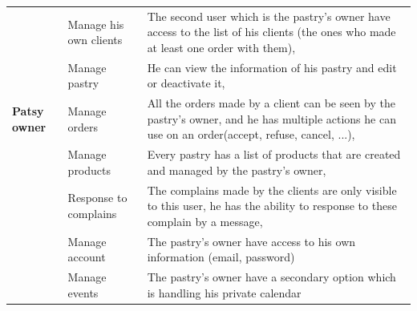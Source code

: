 \documentclass[12pt,a4paper]{report}
\begin{document}
\begin{table}[H]
\begin{center}
\begin{tabular}{|l|p{5cm}|p{8cm}| }
				\hline
				\hline
				\multirow{5}{*}{\textbf{Patsy owner} }
				& Manage his own clients & The second user which is the pastry's owner have access to the list of his clients (the ones who made at least one order with them),                
				\\
				\cline{2-3}
				& Manage pastry          & He can view the information of his pastry and edit or deactivate it,                                                                                
				\\
				\cline{2-3}
				& Manage orders          & All the orders made by a client can be seen by the pastry's owner, and he has multiple actions he can use on an order(accept, refuse, cancel, ...), 
				\\
				\cline{2-3}
				& Manage products        & Every pastry has a list of products that are created and managed by the pastry's owner,                                                             
				\\
				\cline{2-3}
				& Response to complains  & The complains made by the clients are only visible to this user, he has the ability to response to these complain by a message,                     
				\\
				\cline{2-3}
				& Manage account         & The pastry's owner have access to his own information (email, password)                                                                             \\
				\cline{2-3}
				& Manage events          & The pastry's owner have a secondary option which is handling his private calendar                                                                   \\
				\hline
			\end{tabular}
		\end{center}
		
		
	\end{table}
	
	
\end{document}
